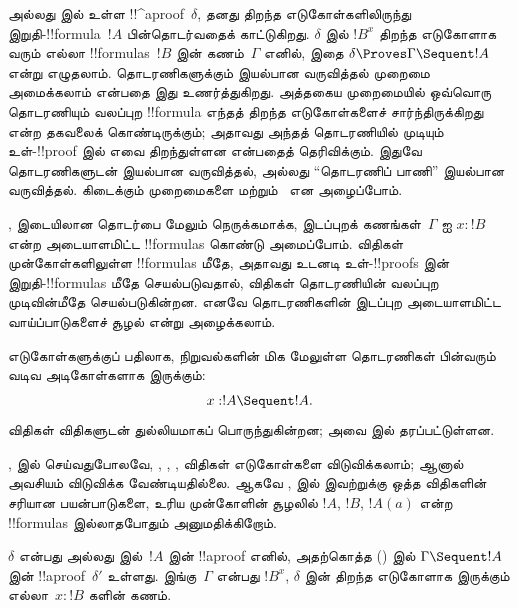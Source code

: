 \documentclass[../../../include/open-logic-section]{subfiles}
\begin{document}


 அல்லது  இல் உள்ள !!^a{proof}~$\delta$,
தனது திறந்த எடுகோள்களிலிருந்து இறுதி-!!{formula}~$!A$
பின்தொடர்வதைக் காட்டுகிறது. $\delta$ இல் $!B^x$ திறந்த
எடுகோளாக வரும் எல்லா !!{formula}s~$!B$ இன் கணம்~$\Gamma$
எனில், இதை $\delta \Proves \Gamma \Sequent !A$ என்று
எழுதலாம். தொடரணிகளுக்கும் இயல்பான வருவித்தல் முறைமை
அமைக்கலாம் என்பதை இது உணர்த்துகிறது. அத்தகைய முறைமையில்
ஒவ்வொரு தொடரணியும் வலப்புற !!{formula} எந்தத் திறந்த
எடுகோள்களைச் சார்ந்திருக்கிறது என்ற தகவலைக் கொண்டிருக்கும்;
அதாவது அந்தத் தொடரணியில் முடியும் உள்-!!{proof} இல் எவை
திறந்துள்ளன என்பதைத் தெரிவிக்கும். இதுவே தொடரணிகளுடன்
இயல்பான வருவித்தல், அல்லது ``தொடரணிப் பாணி'' இயல்பான
வருவித்தல். கிடைக்கும் முறைமைகளை  மற்றும்~
என அழைப்போம்.

,  இடையிலான தொடர்பை மேலும் நெருக்கமாக்க,
இடப்புறக் கணங்கள்~$\Gamma$ ஐ $x:!B$ என்ற அடையாளமிட்ட
!!{formula}s கொண்டு அமைப்போம்.  விதிகள்
முன்கோள்களிலுள்ள !!{formula}s மீதே, அதாவது உடனடி
உள்-!!{proof}s இன் இறுதி-!!{formula}s மீதே செயல்படுவதால்,
 விதிகள் தொடரணியின் வலப்புற முடிவின்மீதே
செயல்படுகின்றன. எனவே தொடரணிகளின் இடப்புற அடையாளமிட்ட
வாய்ப்பாடுகளைச் சூழல் என்று அழைக்கலாம்.

எடுகோள்களுக்குப் பதிலாக,  நிறுவல்களின் மிக
மேலுள்ள தொடரணிகள் பின்வரும் வடிவ அடிகோள்களாக இருக்கும்:
\[x:!A \Sequent !A.\]
விதிகள்  விதிகளுடன் துல்லியமாகப் பொருந்துகின்றன;
அவை  இல் தரப்பட்டுள்ளன.



,  இல் செய்வதுபோலவே, \Intro{\lif},
\Intro{\lnot}, \Elim{\lor}, \Elim{\lexists} விதிகள்
எடுகோள்களை விடுவிக்கலாம்; ஆனால் அவசியம் விடுவிக்க
வேண்டியதில்லை. ஆகவே ,  இல் இவற்றுக்கு
ஒத்த விதிகளின் சரியான பயன்பாடுகளை, உரிய முன்கோளின்
சூழலில் $!A$, $!B$, $!A(a)$ என்ற !!{formula}s
இல்லாதபோதும் அனுமதிக்கிறோம்.

\begin{prop}
$\delta$ என்பது  அல்லது  இல்~$!A$
இன் !!a{proof} எனில், அதற்கொத்த  () இல்
$\Gamma \Sequent !A$ இன் !!a{proof}~$\delta'$ உள்ளது.
இங்கு~$\Gamma$ என்பது $!B^x$, $\delta$ இன் திறந்த
எடுகோளாக இருக்கும் எல்லா~$x:!B$ களின் கணம்.
\end{prop}
\end{document}
